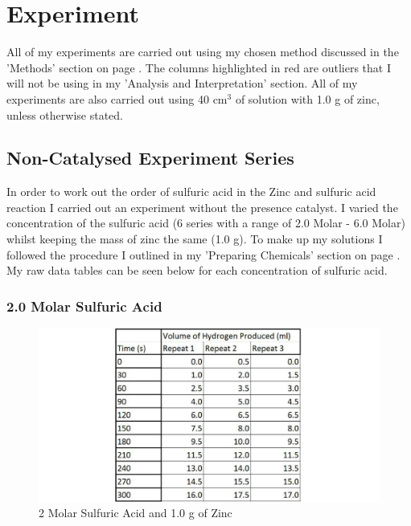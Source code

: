 \chapter {Experiment}

All of my experiments are carried out using my chosen method discussed in the 'Methods' section on page \pageref{Chosen Method}. The columns highlighted in red are outliers that I will not be using in my 'Analysis and Interpretation' section. All of my experiments are also carried out using 40 cm$^3$ of solution with 1.0 g of zinc, unless otherwise stated.

\section{Non-Catalysed Experiment Series}

In order to work out the order of sulfuric acid in the Zinc and sulfuric acid reaction I carried out an experiment without the presence catalyst. I varied the concentration of the sulfuric acid (6 series with a range of 2.0 Molar - 6.0 Molar) whilst keeping the mass of zinc the same (1.0 g). To make up my solutions I followed the procedure I outlined in my 'Preparing Chemicals' section on page \pageref{Preparing Chemicals}. My raw data tables can be seen below for each concentration of sulfuric acid.

	\subsection{2.0 Molar Sulfuric Acid}

\begin{figure}[H]
    \includegraphics[width=\textwidth]{./Experiment/Images/1NonCatalyst/2Molar.pdf}
    \caption{2 Molar Sulfuric Acid and 1.0 g of Zinc} \label{fig:2MolarSARawData}
\end{figure}


